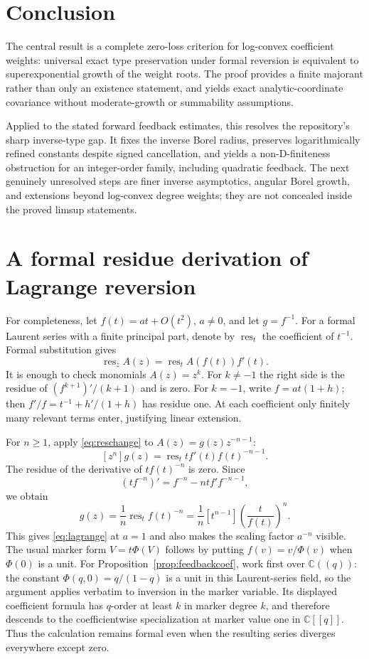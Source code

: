 \documentclass[11pt,a4paper]{article}
\numberwithin{equation}{section}
\theoremstyle{definition}
\theoremstyle{remark}
\newcommand{\C}{\mathbb C}
\newcommand{\res}{\operatorname{res}}
\begin{document}
\section{Conclusion}

The central result is a complete zero-loss criterion for log-convex
coefficient weights: universal exact type preservation under formal
reversion is equivalent to superexponential growth of the weight roots.
The proof provides a finite majorant rather than only an existence
statement, and yields exact analytic-coordinate covariance without
moderate-growth or summability assumptions.

Applied to the stated forward feedback estimates, this resolves the
repository's sharp inverse-type gap. It fixes the inverse Borel radius,
preserves logarithmically refined constants despite signed cancellation,
and yields a non-D-finiteness obstruction for an integer-order family,
including quadratic feedback. The next genuinely unresolved steps are
finer inverse asymptotics, angular Borel growth, and extensions beyond
log-convex degree weights; they are not concealed inside the proved
limsup statements.

\appendix
\section{A formal residue derivation of Lagrange reversion}
\label{app:lagrange}

For completeness, let $f(t)=at+O(t^2)$, $a\ne0$, and let $g=f^{-1}$.
For a formal Laurent series with a finite principal part, denote by
$\res_t$ the coefficient of $t^{-1}$. Formal substitution gives
\begin{equation}
 \res_z A(z)=\res_t A(f(t))f'(t).
 \label{eq:reschange}
\end{equation}
It is enough to check monomials $A(z)=z^k$. For $k\ne-1$ the right
side is the residue of $(f^{k+1})'/(k+1)$ and is zero. For $k=-1$,
write $f=at(1+h)$; then
$f'/f=t^{-1}+h'/(1+h)$ has residue one. At each coefficient only
finitely many relevant terms enter, justifying linear extension.

For $n\ge1$, apply \eqref{eq:reschange} to
$A(z)=g(z)z^{-n-1}$:
\[
 [z^n]g(z)=\res_t t f'(t)f(t)^{-n-1}.
\]
The residue of the derivative of $t f(t)^{-n}$ is zero. Since
\[
 (t f^{-n})'=f^{-n}-ntf'f^{-n-1},
\]
we obtain
\begin{equation}
 [z^n]g(z)=\frac1n\res_t f(t)^{-n}
 =\frac1n[t^{n-1}]\left(\frac{t}{f(t)}\right)^n.
 \label{eq:lagrangegeneral}
\end{equation}
This gives \eqref{eq:lagrange} at $a=1$ and also makes the scaling
factor $a^{-n}$ visible. The usual marker form
$V=t\Phi(V)$ follows by putting $f(v)=v/\Phi(v)$ when $\Phi(0)$
is a unit. For Proposition~\ref{prop:feedbackcoef}, work first over
$\C((q))$: the constant $\Phi(q,0)=q/(1-q)$ is a unit in this
Laurent-series field, so the argument applies verbatim to inversion in
the marker variable. Its displayed coefficient formula has $q$-order
at least $k$ in marker degree $k$, and therefore descends to the
coefficientwise specialization at marker value one in $\C[[q]]$.
Thus the calculation remains formal even when the resulting series
diverges everywhere except zero.
\end{document}
